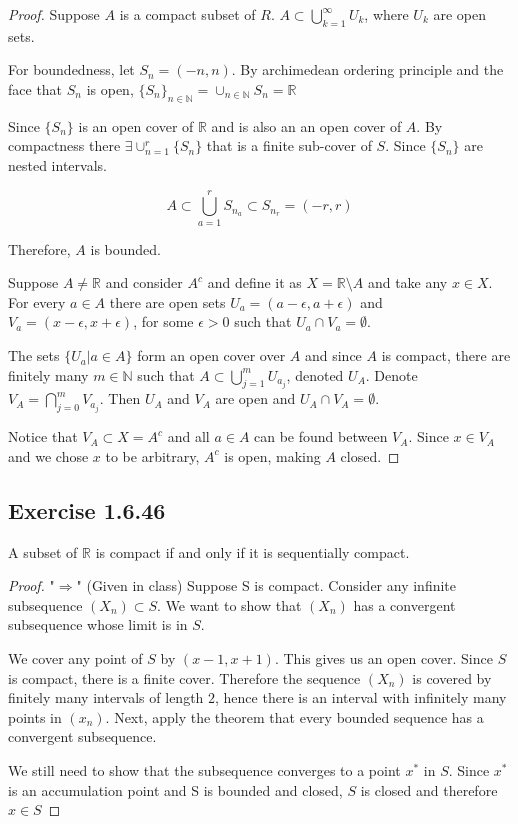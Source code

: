 \documentclass{tufte-book}
\theoremstyle{mytheoremstyle}
\theoremstyle{mylemstyle}
\theoremstyle{mydefstyle}
\begin{document}
\begin{proof}
Suppose $A$ is a compact subset of $R$.  $A \subset \bigcup\limits_{k=1}^{\infty}U_k$, where $U_k$ are open sets.

For boundedness, let $S_n = (-n,n)$.  By archimedean ordering principle and the face that $S_n$ is open, $\{S_n\}_{n \in \mathbb{N}} = \cup_{n \in \mathbb{N}}S_n = \mathbb{R}$

Since $\{S_n\}$ is an open cover of $\mathbb{R}$ and is also an an open cover of $A$. By compactness there $\exists \cup_{n=1}^{r}\{S_n\}$ that is a finite sub-cover of $S$.  Since $\{S_n\}$ are nested intervals.

\[ A \subset \bigcup_{a=1}^rS_{n_{a}} \subset S_{n_{r}} = (-r, r)\]

Therefore, $A$ is bounded.

Suppose $A \neq \mathbb{R}$ and consider $A^c$ and define it as $X = \mathbb{R} \setminus A$ and take any $x \in X$. For every $a \in A$ there are open sets $U_a = (a-\epsilon,a+\epsilon)$ and $V_a = (x-\epsilon, x+\epsilon)$, for some $\epsilon > 0$ such that $U_a \cap V_a = \emptyset$.

The sets $\{U_a | a \in A\}$ form an open cover over $A$ and since $A$ is compact, there are finitely many $m \in \mathbb{N}$ such that $A \subset \bigcup\limits_{j=1}^{m}U_{a_{j}}$, denoted $U_A$.  Denote $V_A=\bigcap\limits_{j=0}^{m}V_{a_{j}}$.  Then $U_A$ and $V_A$ are open and $U_A \cap V_A = \emptyset$.

Notice that $V_A \subset X = A^c$ and all $a \in A$ can be found between $V_A$. Since $x \in V_A$ and we chose $x$ to be arbitrary,  $A^c$ is open, making $A$ closed.

\end{proof}

\subsection{Exercise 1.6.46}

A subset of $\mathbb{R}$ is compact if and only if it is sequentially compact.

\begin{proof}"$\Rightarrow$" (Given in class)
Suppose S is compact. Consider any infinite subsequence $(X_n) \subset S$.  We want to show that $(X_n)$ has a convergent subsequence whose limit is in $S$.

We cover any point of $S$ by $(x-1, x+1)$.  This gives us an open cover.  Since $S$ is compact, there is a finite cover.  Therefore the sequence $(X_n)$ is covered by finitely many intervals of length $2$, hence there is an interval with infinitely many points in $(x_n)$.  Next, apply the theorem that every bounded sequence has a convergent subsequence.

We still need to show that the subsequence converges to a point $x^*$ in $S$. Since $x^*$ is an accumulation point and S is bounded and closed, $S$ is closed and therefore $x \in S$

\end{proof}
\end{document}

